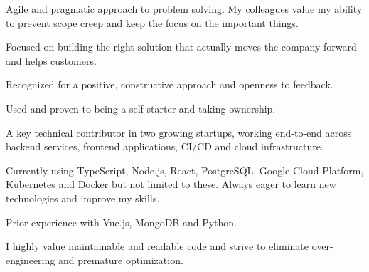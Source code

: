 \documentclass[8pt]{developercv} %
\begin{document}
\vspace{0.5cm}



\begin{minipage}[t]{0.45\textwidth} %
	\vspace{-\baselineskip} %

	Agile and pragmatic approach to problem solving. My colleagues value my ability to prevent scope creep and keep the focus on the important things.

	Focused on building the right solution that actually moves the company forward and helps customers.

	Recognized for a positive, constructive approach and openness to feedback.

	Used and proven to being a self-starter and taking ownership.

\end{minipage}
\hfill %
\begin{minipage}[t]{0.45\textwidth} %
	\vspace{-\baselineskip} %

	A key technical contributor in two growing startups, working end-to-end across backend services, frontend applications, CI/CD and cloud infrastructure.

	Currently using TypeScript, Node.js, React, PostgreSQL, Google Cloud Platform, Kubernetes and Docker but not limited to these. Always eager to learn new technologies and improve my skills.

	Prior experience with Vue.js, MongoDB and Python.
	
	I highly value maintainable and readable code and strive to eliminate over-engineering and premature optimization.
\end{minipage}


\end{document}

